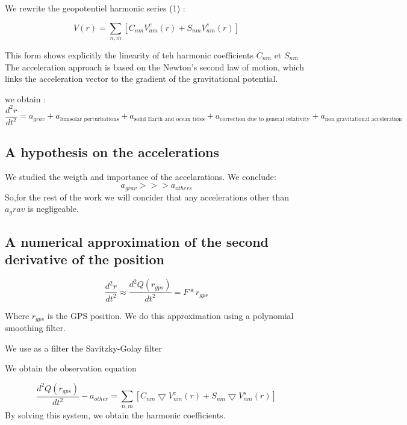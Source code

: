 \documentclass{article}
\begin{document}
We rewrite the geopotentiel harmonic series  (1) :

\begin{equation}
    V(r) = \sum_{n,m } \left[ C_{nm} V_{nm}^{c}(r) + S_{nm} V_{nm}^{s}(r) \right]  
\end{equation}

This form shows explicitly the linearity of teh harmonic coefficients $C_{nm}$ et $S_{nm}$ \\


The acceleration approach is based on the Newton's second law of motion, which links the acceleration vector to the gradient of the gravitational potential.

we obtain : 
\[
\frac{d^2 r}{d t^2} = a_{grav} + a_{\text{lunisolar perturbations}} + a_{\text{solid Earth and ocean tides}} + a_{\text{correction due to general relativity}} + a_{\text{non gravitational acceleration}}
\]

\subsection{A hypothesis on the accelerations}

We studied the weigth and importance of the accelarations. We conclude: 
\begin{equation*}
    a_{grav}  >>> a_{others} 
\end{equation*}
So,for the rest of the work we will concider that any accelerations other than $a_grav$ is negligeable.

\subsection{A numerical approximation of the second derivative of the position}
\begin{equation}
    \frac{d^2 r}{dt^2} \approx \frac{d^2 Q(r_{gps})}{dt^2} = F * r_{gps} 
\end{equation}

Where $r_{gps}$ is the GPS position. We do this approximation using a polynomial smoothing filter.

We use as a filter the Savitzky-Golay filter 



\vspace{1 cm}

We obtain the observation equation

\begin{equation}
    \frac{d^2 Q (r_{gps})}{dt^2} - a_{other} = \sum_{n,m }   \left[ C_{nm} \bigtriangledown V_{nm}^{c}(r) + S_{nm} \bigtriangledown V_{nm}^{s}(r) \right]  
\end{equation}
By solving this system, we obtain the harmonic coefficients. 
\end{document}
